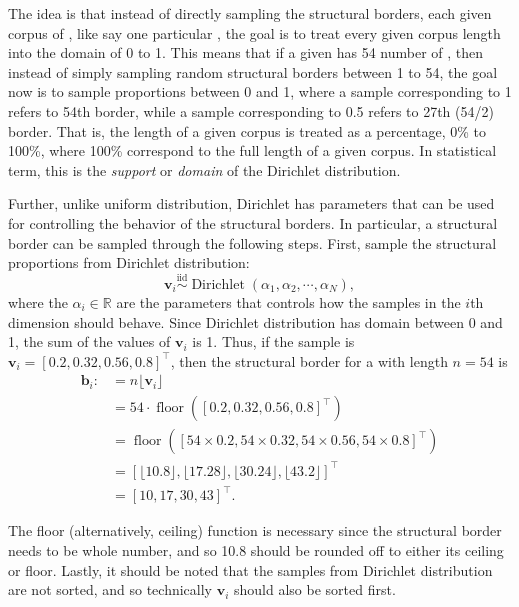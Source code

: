 The idea is that instead of directly sampling the structural borders, each given corpus of  , like say one particular  , the goal is to treat every given corpus length into the domain of 0 to 1. This means that if a given   has 54 number of  , then instead of simply sampling random structural borders between 1 to 54, the goal now is to sample proportions between 0 and 1, where a sample corresponding to 1 refers to 54th border, while a sample corresponding to 0.5 refers to 27th (54/2) border. That is, the length of a given corpus is treated as a percentage, 0\% to 100\%, where 100\% correspond to the full length of a given corpus. In statistical term, this is the \textit{support} or \textit{domain} of the Dirichlet distribution.

Further, unlike uniform distribution, Dirichlet has parameters that can be used for controlling the behavior of the structural borders. In particular, a structural border can be sampled through the following steps. First, sample the structural proportions from Dirichlet distribution:
\begin{equation}
    \mathbf{v}_i\overset{\text{iid}}{\sim}\operatorname{Dirichlet}(\alpha_1,\alpha_2,\cdots,\alpha_N),
\end{equation}
where the $\alpha_i\in\mathbb{R}$ are the parameters that controls how the samples in the $i$th dimension should behave. Since Dirichlet distribution has domain between 0 and 1, the sum of the values of $\mathbf{v}_i$ is 1. Thus, if the sample is $\mathbf{v}_i=[0.2, 0.32, 0.56, 0.8]^{\top}$, then the structural border for a   with length $n=54$ is
\begin{align}
    \mathbf{b}_{i}:&=n\lfloor\mathbf{v}_i\rfloor\\
    &=54\cdot\operatorname{floor}([0.2, 0.32, 0.56, 0.8]^{\top})\\
    &=\operatorname{floor}([54\times 0.2, 54\times 0.32, 54\times 0.56, 54\times 0.8]^{\top})\\
    &=[\lfloor 10.8\rfloor, \lfloor 17.28\rfloor , \lfloor 30.24\rfloor , \lfloor 43.2\rfloor ]^{\top}\\
    &=[10, 17, 30, 43]^{\top}.
\end{align}

The floor (alternatively, ceiling) function is necessary since the structural border needs to be whole number, and so 10.8 should be rounded off to either its ceiling or floor. Lastly, it should be noted that the samples from Dirichlet distribution are not sorted, and so technically $\mathbf{v}_i$ should also be sorted first. 

